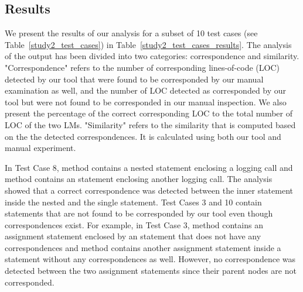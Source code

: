 \subsection{Results}  \label{study2-results}
We present the results of our analysis for a subset of 10 test cases (see Table~\ref{study2_test_cases}) in Table~\ref{study2_test_cases_results}. The analysis of the output has been divided into two categories: correspondence and similarity. "Correspondence" refers to the number of corresponding lines-of-code (LOC) detected by our tool that were found to be corresponded by our manual examination as well, and the number of LOC detected as corresponded by our tool but were not found to be corresponded in our manual inspection. We also present the percentage of the correct corresponding LOC to the total number of LOC of the two LMs. "Similarity" refers to the similarity that is computed based on the the detected correspondences. It is calculated using both our tool and manual experiment.


In Test Case 8,  method contains a nested statement enclosing a logging call and  method contains an  statement enclosing another logging call. The analysis showed that a correct correspondence was detected between the inner statement inside the nested  and the single  statement. Test Cases 3 and 10 contain statements that are not found to be corresponded by our tool even though correspondences exist. For example, in Test Case 3,  method contains an assignment statement enclosed by an  statement that does not have any correspondences and  method contains another assignment statement inside a  statement without any correspondences as well. However, no correspondence was detected between the two assignment statements since their parent nodes are not corresponded.

